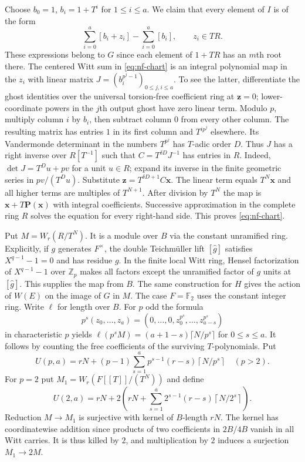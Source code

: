 \documentclass[11pt,letterpaper]{article}
\theoremstyle{definition}
\numberwithin{equation}{section}
\begin{document}
Choose $b_0=1$, $b_i=1+T^i$ for $1\le i\le a$.
We claim that every element of $I$ is of the form
\begin{equation}\label{eq:nf-chart}
 \sum_{i=0}^a[b_i+z_i]-\sum_{i=0}^a[b_i],\qquad z_i\in TR .
\end{equation}
These expressions belong to $G$ since each element of $1+TR$ has
an $m$th root there. The centered Witt sum in \eqref{eq:nf-chart}
is an integral polynomial map in the $z_i$ with linear matrix
$J=(b_i^{p^j-1})_{0\le j,i\le a}$. To see the latter, differentiate
the ghost identities over the universal torsion-free coefficient ring
at $\mathbf z=0$; lower-coordinate powers in the $j$th output ghost
have zero linear term. Modulo $p$, multiply column $i$ by $b_i$,
then subtract column $0$ from every other column. The resulting
matrix has entries $1$ in its first column and $T^{ip^j}$ elsewhere.
Its Vandermonde determinant in the numbers $T^{p^j}$ has $T$-adic
order $D$. Thus $J$ has a right inverse over $R[T^{-1}]$ such that
$C=T^{\delta D}J^{-1}$ has entries in $R$. Indeed,
$\det J=T^D u+p v$ for a unit $u\in R$; expand its inverse in the
finite geometric series in $pv/(T^D u)$. Substitute
$\mathbf z=T^{\delta D+1}C\mathbf x$. The linear term equals
$T^N\mathbf x$ and all higher terms are multiples of $T^{N+1}$.
After division by $T^N$ the map is $\mathbf x+T\mathbf P(\mathbf x)$
with integral coefficients. Successive approximation in the complete
ring $R$ solves the equation for every right-hand side. This proves
\eqref{eq:nf-chart}.

Put $M=W_r(R/T^N)$. It is a module over $B$ via the constant unramified
ring. Explicitly, if $g$ generates $F^\times$, the double
Teichm\"uller lift $[\widehat g]$ satisfies $X^{q-1}-1=0$ and
has residue $g$. In the finite local Witt ring, Hensel factorization
of $X^{q-1}-1$ over $\mathbb Z_p$ makes all factors except the
unramified factor of $g$ units at $[\widehat g]$. This supplies the
map from $B$. The same construction for $H$ gives the action of
$W(E)$ on the image of $G$ in $M$. The case $F=\mathbb F_2$
uses the constant integer ring. Write $\ell$ for length over $B$.
For $p$ odd the formula
\[
 p^s(z_0,\ldots,z_a)
  =(0,\ldots,0,z_0^{p^s},\ldots,z_{a-s}^{p^s})
\]
in characteristic $p$ yields
$\ell(p^sM)=(a+1-s)\lceil N/p^s\rceil$ for $0\le s\le a$.
It follows by counting the free coefficients of the surviving
$T$-polynomials. Put
\[
 U(p,a)=rN+
 (p-1)\sum_{s=1}^{a}p^{s-1}(r-s)\left\lceil N/p^s\right\rceil
 \quad(p>2).
\]
For $p=2$ put $M_1=W_r(F[[T]]/(T^N))$ and define
\[
 U(2,a)=rN+2\left(rN+\sum_{s=1}^a
 2^{s-1}(r-s)\left\lceil N/2^s\right\rceil\right).
\]
Reduction $M\to M_1$ is surjective with kernel of $B$-length $rN$.
The kernel has coordinatewise addition since products of two coefficients
in $2B/4B$ vanish in all Witt carries. It is thus killed by $2$,
and multiplication by $2$ induces a surjection $M_1\to2M$.
\end{document}
